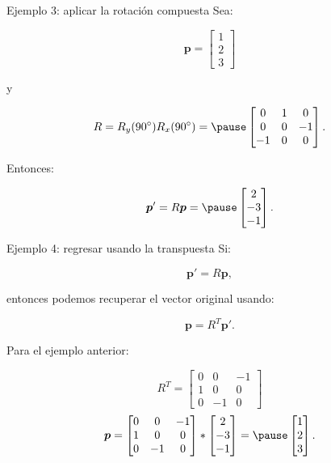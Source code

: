 \documentclass[aspectratio=169,10pt]{beamer}
\begin{document}
\begin{frame}{Ejemplo 3: aplicar la rotación compuesta}
    \small
    Sea:

    \[
    \boldsymbol{p}=\begin{bmatrix}1\\2\\3\end{bmatrix}
    \]

    y

    \[
    R=R_y(90^\circ)R_x(90^\circ)
    =\pause
    \begin{bmatrix}
        0&1&0\\
        0&0&-1\\
        -1&0&0
    \end{bmatrix}.
    \]

    Entonces:

    \[
    \boldsymbol{p}'=R\boldsymbol{p}
    =\pause
    \begin{bmatrix}
        2\\-3\\-1
    \end{bmatrix}.
    \]

\end{frame}

\begin{frame}{Ejemplo 4: regresar usando la transpuesta}
    \small
    Si:

    \[
    \boldsymbol{p}'=R\boldsymbol{p},
    \]

    entonces podemos recuperar el vector original usando:

    \[
    \boldsymbol{p}=R^T\boldsymbol{p}'.
    \]

    Para el ejemplo anterior:

    \[
    R^T=
    \begin{bmatrix}
        0&0&-1\\
        1&0&0\\
        0&-1&0
    \end{bmatrix}
    \]
\vspace{0.2cm}
    \[
    \boldsymbol{p}=
        \begin{bmatrix}
        0&0&-1\\
        1&0&0\\
        0&-1&0
    \end{bmatrix}
    *
    \begin{bmatrix}
        2\\-3\\-1
    \end{bmatrix}
    =\pause
    \begin{bmatrix}
        1\\2\\3
    \end{bmatrix}.
    \]

\end{frame}
\end{document}
